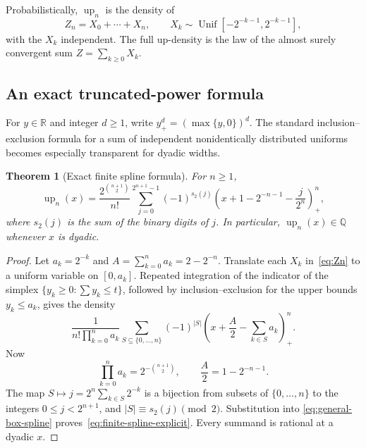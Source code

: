 \documentclass[11pt,a4paper]{article}
\newtheorem{theorem}{Theorem}[section]
\theoremstyle{remark}
\newcommand{\R}{\mathbb{R}}
\newcommand{\Q}{\mathbb{Q}}
\newcommand{\up}{\operatorname{up}}
\begin{document}
Probabilistically, $\up_n$ is the density of
\begin{equation}
 Z_n=X_0+\cdots+X_n,
 \qquad X_k\sim\operatorname{Unif}
 [-2^{-k-1},2^{-k-1}],
 \label{eq:Zn}
\end{equation}
with the $X_k$ independent.  The full up-density is the law of the almost
surely convergent sum $Z=\sum_{k\ge0}X_k$.

\subsection{An exact truncated-power formula}

For $y\in\R$ and integer $d\ge1$, write
$y_+^d=(\max\{y,0\})^d$.  The standard inclusion--exclusion formula for a
sum of independent nonidentically distributed uniforms becomes especially
transparent for dyadic widths.

\begin{theorem}[Exact finite spline formula]
\label{thm:truncated-power}
For $n\ge1$,
\begin{equation}
 \boxed{
 \up_n(x)=\frac{2^{\binom{n+1}{2}}}{n!}
 \sum_{j=0}^{2^{n+1}-1}(-1)^{s_2(j)}
 \left(x+1-2^{-n-1}-\frac{j}{2^n}\right)_+^n, }
 \label{eq:finite-spline-explicit}
\end{equation}
where $s_2(j)$ is the sum of the binary digits of $j$.  In particular,
$\up_n(x)\in\Q$ whenever $x$ is dyadic.
\end{theorem}

\begin{proof}
Let $a_k=2^{-k}$ and $A=\sum_{k=0}^na_k=2-2^{-n}$.  Translate each
$X_k$ in~\eqref{eq:Zn} to a uniform variable on $[0,a_k]$.  Repeated
integration of the indicator of the simplex
$\{y_k\ge0:\sum y_k\le t\}$, followed by inclusion--exclusion for the upper
bounds $y_k\le a_k$, gives the density
\begin{equation}
 \frac{1}{n!\prod_{k=0}^na_k}
 \sum_{S\subseteq\{0,\ldots,n\}}(-1)^{|S|}
 \left(x+\frac A2-\sum_{k\in S}a_k\right)_+^n.
 \label{eq:general-box-spline}
\end{equation}
Now
\[
 \prod_{k=0}^na_k=2^{-\binom{n+1}{2}},
 \qquad \frac A2=1-2^{-n-1}.
\]
The map
$S\mapsto j=2^n\sum_{k\in S}2^{-k}$ is a bijection from subsets of
$\{0,\ldots,n\}$ to the integers $0\le j<2^{n+1}$, and
$|S|\equiv s_2(j)\pmod2$.  Substitution into
\eqref{eq:general-box-spline} proves~\eqref{eq:finite-spline-explicit}.
Every summand is rational at a dyadic $x$.
\end{proof}
\end{document}
